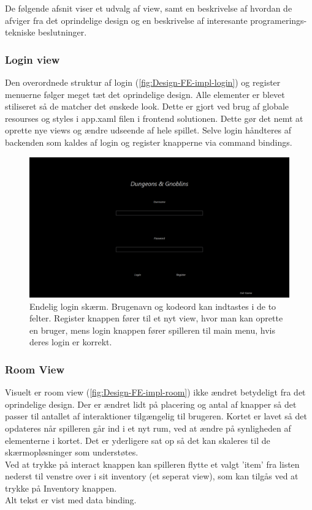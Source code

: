 \noindent De følgende afsnit viser et udvalg af view, samt en beskrivelse af hvordan de afviger fra det oprindelige design og en beskrivelse af interesante programerings-tekniske beslutninger.

\subsubsection{Login view}
Den overordnede struktur af login (\autoref{fig:Design-FE-impl-login}) og register menuerne følger meget tæt det oprindelige design. Alle elementer er blevet stiliseret så de matcher det ønskede look. Dette er gjort ved brug af globale resourses og styles i app.xaml filen i frontend solutionen. Dette gør det nemt at oprette nye views og ændre udseende af hele spillet. Selve login håndteres af backenden som kaldes af login og register knapperne via command bindings.

\begin{figure}[H]
\centering
\includegraphics[width = \textwidth]{02-Body/Images/login_final.PNG}
\caption{Endelig login skærm. Brugenavn og kodeord kan indtastes i de to felter. Register knappen fører til et nyt view, hvor man kan oprette en bruger, mens login knappen fører spilleren til main menu, hvis deres login er korrekt.}
\label{fig:Design-FE-impl-login}
\end{figure}

\subsubsection{Room View}

Visuelt er room view (\autoref{fig:Design-FE-impl-room}) ikke ændret betydeligt fra det oprindelige design. Der er ændret lidt på placering og antal af knapper så det passer til antallet af interaktioner tilgængelig til brugeren. Kortet er lavet så det  opdateres når spilleren går ind i et nyt rum, ved at ændre på synligheden af elementerne i kortet. Det er yderligere sat op så det kan skaleres til de skærmopløsninger som understøtes.\\
Ved at trykke på interact knappen kan spilleren flytte et valgt 'item' fra listen nederst til venstre over i sit inventory (et seperat view), som kan tilgås ved at trykke på Inventory knappen.\\
Alt tekst er vist med data binding.

